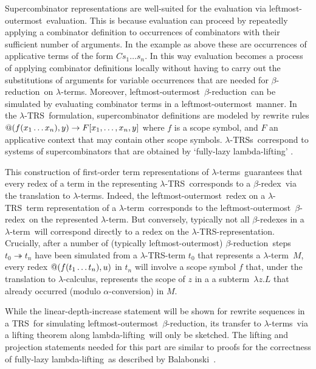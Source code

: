 \documentclass[
submission
]{dmtcs-episciences-tampered}
\makeatletter
\newcommand{\fap}[2]{#1({#2})}
\newcommand{\bfap}[3]{{#1}({#2},\hspace*{0.05pt}{#3})}
\newcommand{\indap}[2]{#1 _{#2}}
\newcommand{\nb}{\nobreakdash}
\newcommand{\cvar}{z}
\newcommand{\ater}{s}
\newcommand{\bter}{t}
\newcommand{\cter}{u}
\newcommand{\ateri}{\indap{\ater}}
\newcommand{\bteri}{\indap{\bter}}
\newcommand{\TRS}{TRS}
\newcommand{\sfolapp}{@}
\newcommand{\folapp}{\bfap{\sfolapp}}
\newcommand{\afoscopesym}{f}
\newcommand{\afoscope}{\fap{\afoscopesym}}
\newcommand{\cxtap}[2]{{#1}[#2]}
\newcommand{\afoscopecxt}{F}
\newcommand{\afoscopecxtap}{\cxtap{\afoscopecxt}}
\newcommand{\alter}{M}
\newcommand{\clter}{L}
\newcommand{\sslabs}{\lambda}
\newcommand{\slabs}[1]{\sslabs{#1}.}
\newcommand{\labs}[2]{\slabs{#1}{#2}}
\newcommand{\sred}{\to}
\newcommand{\red}{\mathrel{\sred}}
\newcommand{\smred}{\twoheadrightarrow}
\newcommand{\mred}{\mathrel{\smred}}
\newcommand{\lambdacalculus}{$\lambda$\nb-cal\-cu\-lus}
\newcommand{\lambdaterm}{$\lambda$\nb-term}
\newcommand{\lambdaterms}{\lambdaterm{s}}
\newcommand{\lambdalifting}{lambda-lif\-ting}
\newcommand{\betareduction}{$\beta$\nb-re\-duc\-tion}
\newcommand{\betaredex}{$\beta$\nb-re\-dex}
\newcommand{\alphaconversion}{$\alpha$\nb-con\-ver\-sion}
\newcommand{\lo}{left\-most-outer\-most}
\newcommand{\lTRSrepresentation}{\lTRS\nb-re\-pre\-sen\-ta\-tion}
\newcommand{\lTRS}{$\lambda$\hspace*{-0.5pt}\nb-\hspace*{-0.5pt}\TRS}
\newcommand{\lTRSs}{\lTRS{s}}
\theoremstyle{plain}
\theoremstyle{definition}
\makeatother
\begin{document}
  Supercombinator representations are well-suited for the evaluation via \lo\ evaluation. This is because evaluation can proceed by repeatedly applying a combinator definition
  to occurrences of combinators with their sufficient number of arguments.
  In the example as above these are occurrences of applicative terms of the form $C \ateri{1} \ldots \ateri{n}$. 
  In this way evaluation becomes a process of applying combinator definitions locally 
  without having to carry out the substitutions of arguments for variable occurrences that are needed for \betareduction\ on \lambdaterms.
  Moreover, \lo\ \betareduction\ can be simulated by evaluating combinator terms in a \lo\ manner. 
  In the \lTRS\ formulation,
  supercombinator definitions are modeled by rewrite rules 
  $ \folapp{\afoscope{x_1 \ldots x_n}}{y} \red \afoscopecxtap{x_1,\ldots,x_n,y} $ where $\afoscopesym$ is a scope symbol,
  and $\afoscopecxt$ an applicative context that may contain other scope symbols.
  \lTRSs\ correspond to systems of supercombinators that are obtained by `fully-lazy \lambdalifting' \cite{hugh:1982:report,peyt:1987}. 
  
  This construction of first-order term representations of \lambdaterms\ 
  guarantees that every redex of a term in the representing \lTRS\
  corresponds to a \betaredex\ via the translation to \lambdaterms. 
  Indeed, the \lo\ redex on a \lTRS\ term representation of a \lambdaterm\ corresponds to the \lo\ \betaredex\ on the represented \lambdaterm. 
  But conversely, typically not all \betaredex{es} in a \lambdaterm\ will correspond directly to a redex on the \lTRSrepresentation.
  Crucially, after a number of (typically \lo) \betareduction\ steps $\bteri{0} \mred \bteri{n}$ 
    have been simulated from a \lTRS\nb-term $\bteri{0}$ that represents a \lambdaterm~$\alter$,
  every redex $\folapp{\afoscope{\bteri{1} \ldots \bteri{n}}}{\cter}$ in $\bteri{n}$ will involve a scope symbol $\afoscopesym$ that, 
  under the translation to \lambdacalculus,
  represents the scope of $\cvar$ in a a subterm~$\labs{\cvar}{\clter}$ that already occurred (modulo \alphaconversion) in $\alter$. 
  
  \smallskip





While the linear-depth-increase statement will be shown for rewrite sequences in a \TRS\
for simulating \lo\ \betareduction, its transfer to \lambdaterms\ via a lifting theorem along \lambdalifting\
will only be sketched. The lifting and projection statements needed for this part are similar
to proofs for the correctness of fully-lazy \lambdalifting\ as described by Balabonski~\cite{bala:2012}.   
\end{document}
